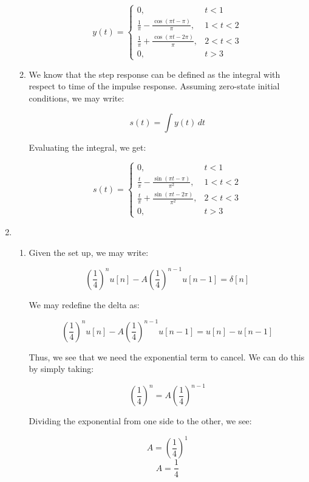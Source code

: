 \begin{enumerate}
\begin{enumerate}
        $$\boxed{y(t)=\left\{\begin{array}{ll} 0, & t<1\\\frac{1}{\pi}-\frac{\cos(\pi t-\pi)}{\pi}, & 1<t<2\\\frac{1}{\pi}+\frac{\cos(\pi t-2\pi)}{\pi}, & 2<t<3\\ 0, & t>3\end{array}}$$

      \item 

        We know that the step response can be defined as the integral with respect to time of the impulse response. Assuming zero-state initial conditions, we may write:

        $$s(t)=\int y(t)\,dt$$

        Evaluating the integral, we get:

        $$\boxed{s(t)=\left\{\begin{array}{ll} 0, & t<1\\\frac{t}{\pi}-\frac{\sin(\pi t-\pi)}{\pi^2}, & 1<t<2\\\frac{t}{\pi}+\frac{\sin(\pi t-2\pi)}{\pi^2}, & 2<t<3\\ 0, & t>3\end{array}}$$

    \end{enumerate}

  \item

    \begin{enumerate}

      \item 

        Given the set up, we may write:

        $$\left( \frac{1}{4} \right)^nu[n]-A\left( \frac{1}{4} \right)^{n-1}u[n-1]=\delta[n]$$

        We may redefine the delta as:

        $$\left( \frac{1}{4} \right)^nu[n]-A\left( \frac{1}{4} \right)^{n-1}u[n-1]=u[n]-u[n-1]$$

        Thus, we see that we need the exponential term to cancel. We can do this by simply taking:

        $$\left( \frac{1}{4} \right)^n=A\left( \frac{1}{4} \right)^{n-1}$$

        Dividing the exponential from one side to the other, we see:

        $$A=\left( \frac{1}{4} \right)^1$$
        $$\boxed{A=\frac{1}{4}}$$


\end{enumerate}
\end{enumerate}
